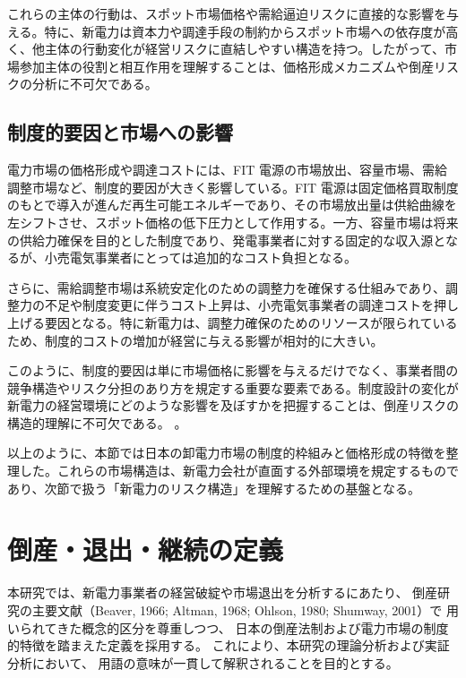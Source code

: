 これらの主体の行動は、スポット市場価格や需給逼迫リスクに直接的な影響を与える。特に、新電力は資本力や調達手段の制約からスポット市場への依存度が高く、他主体の行動変化が経営リスクに直結しやすい構造を持つ。したがって、市場参加主体の役割と相互作用を理解することは、価格形成メカニズムや倒産リスクの分析に不可欠である。

\subsection{制度的要因と市場への影響}

電力市場の価格形成や調達コストには、FIT 電源の市場放出、容量市場、需給調整市場など、制度的要因が大きく影響している。FIT 電源は固定価格買取制度のもとで導入が進んだ再生可能エネルギーであり、その市場放出量は供給曲線を左シフトさせ、スポット価格の低下圧力として作用する。一方、容量市場は将来の供給力確保を目的とした制度であり、発電事業者に対する固定的な収入源となるが、小売電気事業者にとっては追加的なコスト負担となる。

さらに、需給調整市場は系統安定化のための調整力を確保する仕組みであり、調整力の不足や制度変更に伴うコスト上昇は、小売電気事業者の調達コストを押し上げる要因となる。特に新電力は、調整力確保のためのリソースが限られているため、制度的コストの増加が経営に与える影響が相対的に大きい。

このように、制度的要因は単に市場価格に影響を与えるだけでなく、事業者間の競争構造やリスク分担のあり方を規定する重要な要素である。制度設計の変化が新電力の経営環境にどのような影響を及ぼすかを把握することは、倒産リスクの構造的理解に不可欠である。
。

以上のように、本節では日本の卸電力市場の制度的枠組みと価格形成の特徴を整理した。これらの市場構造は、新電力会社が直面する外部環境を規定するものであり、次節で扱う「新電力のリスク構造」を理解するための基盤となる。


\section{倒産・退出・継続の定義}
\label{sec:definitions}

本研究では、新電力事業者の経営破綻や市場退出を分析するにあたり、
倒産研究の主要文献（Beaver, 1966; Altman, 1968; Ohlson, 1980; Shumway, 2001）で
用いられてきた概念的区分を尊重しつつ、
日本の倒産法制および電力市場の制度的特徴を踏まえた定義を採用する。
これにより、本研究の理論分析および実証分析において、
用語の意味が一貫して解釈されることを目的とする。

